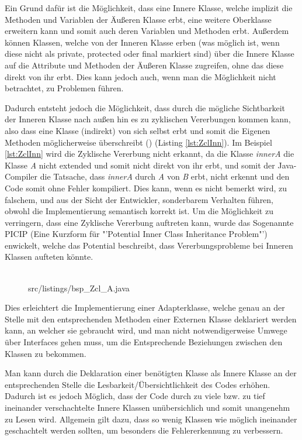 Ein Grund dafür ist die Möglichkeit, dass eine Innere Klasse, welche implizit die Methoden und Variablen der Äußeren Klasse erbt, eine weitere Oberklasse erweitern kann und somit auch deren Variablen und Methoden erbt.
Außerdem können Klassen, welche von der Inneren Klasse erben (was möglich ist, wenn diese nicht als private, protected oder final markiert sind) über die Innere Klasse auf die Attribute und Methoden der Äußeren Klasse zugreifen, ohne das diese direkt von ihr erbt. Dies kann jedoch auch, wenn man die Möglichkeit nicht betrachtet, zu Problemen führen.

Dadurch entsteht jedoch die Möglichkeit, dass durch die mögliche Sichtbarkeit der Inneren Klasse nach außen hin es zu zyklischen Vererbungen kommen kann, also dass eine Klasse (indirekt) von sich selbst erbt und somit die Eigenen Methoden möglicherweise überschreibt (\cite{DBLP:journals/corr/abs-1301-6260}) (Listing \ref{lst:ZclInn}).
Im Beispiel \ref{lst:ZclInn}  wird die Zyklische Vererbung nicht erkannt, da die Klasse {\it innerA} die Klasse {\it A} nicht extended und somit nicht direkt von ihr erbt, und somit der Java-Compiler die Tatsache, dass {\it innerA} durch {\it A} von {\it B} erbt, nicht erkennt und den Code somit ohne Fehler kompiliert.
Dies kann, wenn es nicht bemerkt wird, zu falschem, und aus der Sicht der Entwickler, sonderbarem Verhalten führen, obwohl die Implementierung semantisch korrekt ist.
Um die Möglichkeit zu verringern, dass eine Zyklische Vererbung auftreten kann, wurde das Sogenannte PICIP (Eine Kurzform für "'Potential Inner Class Inheritance Problem"') enwickelt, welche das Potential beschreibt, dass Vererbungsprobleme bei Inneren Klassen aufteten könnte.
\\
\\
\begin{figure}[hbt]
\lstset{language=Java}
 {src/listings/bsp_Zcl_A.java}
\end{figure}
\newpage

Dies erleichtert die Implementierung einer Adapterklasse, welche genau an der Stelle mit den entsprechenden Methoden einer Externen Klasse deklariert werden kann, an welcher sie gebraucht wird, und man nicht notwendigerweise Umwege über Interfaces gehen muss, um die Entsprechende Beziehungen zwischen den Klassen zu bekommen.

Man kann durch die Deklaration einer benötigten Klasse als Innere Klasse an der entsprechenden Stelle die Lesbarkeit/Übersichtlichkeit des Codes erhöhen.
Dadurch ist es jedoch Möglich, dass der Code durch zu viele bzw. zu tief ineinander verschachtelte Innere Klassen unübersichlich und somit unangenehm zu Lesen wird. Allgemein gilt dazu, dass so wenig Klassen wie möglich ineinander geschachtelt werden sollten, um besonders die Fehlererkennung zu verbessern.

